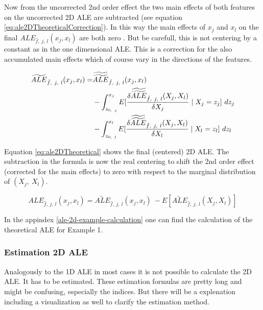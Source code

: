 \documentclass[
]{krantz}
\begin{document}
Now from the uncorrected 2nd order effect the two main effects of both features on the uncorrected 2D ALE are subtracted (see equation \eqref{eq:ale2DTheoreticalCorrection}). In this way the main effects of \(x_j\) and \(x_l\) on the final \(ALE_{\hat{f},~j,~l}(x_j, x_l)\) are both zero \citep[page 9]{Apley2016}. But be carefull, this is not centering by a constant as in the one dimensional ALE. This is a correction for the also accumulated main effects which of course vary in the directions of the features.

\begin{align}
\widetilde{ALE}_{\hat{f},~j,~l}(x_j, x_l) 
= &\widetilde{\widetilde{ALE}}_{\hat{f},~j,~l}(x_j, x_l) \notag \\ 
&-  \int_{z_{0,~j}}^{x_j}  E[\frac{\delta\widetilde{\widetilde{ALE}}_{\hat{f},~j,~l}(X_j, X_l)}{\delta X_j}\mid X_j = z_j]~dz_j \notag \\
&- \int_{z_{0,~l}}^{x_l}  E[\frac{\delta\widetilde{\widetilde{ALE}}_{\hat{f},~j,~l}(X_j, X_l)}{\delta X_l}\mid X_l = z_l]~dz_l
\label{eq:ale2DTheoreticalCorrection}
\end{align}

Equation \eqref{eq:ale2DTheoretical} shows the final (centered) 2D ALE. The subtraction in the formula is now the real centering to shift the 2nd order effect (corrected for the main effects) to zero with respect to the marginal distribution of \((X_j, ~ X_l)\).

\begin{equation} 
ALE_{\hat{f},~j,~l}(x_j, x_l) = \widetilde{ALE}_{\hat{f},~j,~l}(x_j, x_l) ~ -  E[\widetilde{ALE}_{\hat{f},~j,~l}(X_j, X_l)]
  \label{eq:ale2DTheoretical}
\end{equation}

In the appindex \ref{ale-2d-example-calculation} one can find the calculation of the theoretical ALE for Example 1.

\hypertarget{estimation-2d-ale}{%
\subsubsection{Estimation 2D ALE}\label{estimation-2d-ale}}

Analogously to the 1D ALE in most cases it is not possible to calculate the 2D ALE. It has to be estimated. These estimation formulas are pretty long and might be confusing, especially the indices. But there will be a explenation including a visualization as well to clarify the estimation method.
\end{document}
